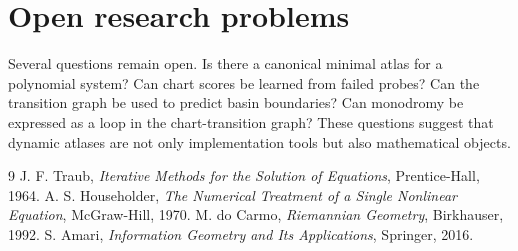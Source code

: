 \documentclass[11pt]{article}
\begin{document}
\section{Open research problems}
Several questions remain open.  Is there a canonical minimal atlas for a polynomial system?  Can chart scores be learned from failed probes?  Can the transition graph be used to predict basin boundaries?  Can monodromy be expressed as a loop in the chart-transition graph?  These questions suggest that dynamic atlases are not only implementation tools but also mathematical objects.

\begin{thebibliography}{9}
 J. F. Traub, \emph{Iterative Methods for the Solution of Equations}, Prentice-Hall, 1964.
 A. S. Householder, \emph{The Numerical Treatment of a Single Nonlinear Equation}, McGraw-Hill, 1970.
 M. do Carmo, \emph{Riemannian Geometry}, Birkhauser, 1992.
 S. Amari, \emph{Information Geometry and Its Applications}, Springer, 2016.
\end{thebibliography}
\end{document}
